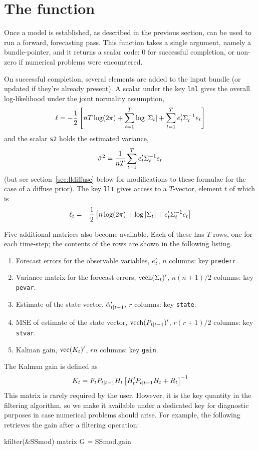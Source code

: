 \section{The  function}
\label{sec:kfilter}

Once a model is established, as described in the previous section,
 can be used to run a forward, forecasting pass.  This
function takes a single argument, namely a bundle-pointer, and it
returns a scalar code: 0 for successful completion, or non-zero if
numerical problems were encountered.

On successful completion, several elements are added to the input
bundle (or updated if they're already present).  A scalar under the
key \texttt{lnl} gives the overall log-likelihood under the joint
normality assumption,
%
\[
  \ell = -\frac{1}{2} \left[nT \log(2 \pi) + \sum_{t=1}^T\log \left|\Sigma_t\right| + 
    \sum_{t=1}^Te_t'\Sigma_t^{-1} e_t
  \right]
\]
%
and the scalar \texttt{s2} holds the estimated variance,
%
\[
\hat{\sigma}^2 = \frac{1}{nT} 
   \sum_{t=1}^Te_t'\Sigma_t^{-1} e_t
\]
(but see section~\ref{sec:lldiffuse} below for modifications to these
formulae for the case of a diffuse prior).  The key \texttt{llt} gives
access to a $T$-vector, element $t$ of which is
%
\[
  \ell_t = -\frac{1}{2} \left[n \log(2 \pi) + \log \left|\Sigma_t\right| + 
    e_t'\Sigma_t^{-1} e_t
  \right]
\]
%

Five additional matrices also become available.  Each of these has $T$
rows, one for each time-step; the contents of the rows are shown in
the following listing.
%
\begin{enumerate}
\item Forecast errors for the observable variables, $e_t'$, $n$
  columns: key \texttt{prederr}.
\item Variance matrix for the forecast errors, $\mbox{vech}(\Sigma_t)'$,
  $n(n+1)/2$ columns: key \texttt{pevar}.
\item Estimate of the state vector, $\hat{\alpha}_{t|t-1}'$, $r$
  columns: key \texttt{state}.
\item MSE of estimate of the state vector,
  $\mbox{vech}(P_{t|t-1})'$, $r(r+1)/2$ columns: key \texttt{stvar}.
\item Kalman gain, $\mbox{vec}(K_t)'$, $rn$ columns: key
  \texttt{gain}.
\end{enumerate}

The Kalman gain is defined as 
\[
K_t = F_t P_{t|t-1} H_t 
\left[H_t' P_{t|t-1} H_t + R_t\right]^{-1}
\]
This matrix is rarely required by the user. However, it is the key
quantity in the filtering algorithm, so we make it available under a
dedicated key for diagnostic purposes in case numerical problems
should arise. For example, the following retrieves the gain after a
filtering operation:
%
\begin{code}
kfilter(&SSmod)
matrix G = SSmod.gain
\end{code}

